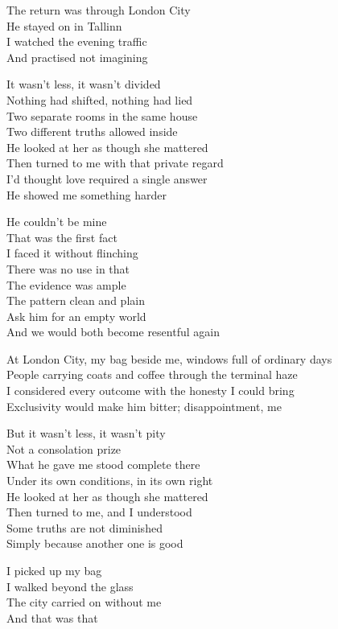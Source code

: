 \begin{lyrics}
The return was through London City\\
He stayed on in Tallinn\\
I watched the evening traffic\\
And practised not imagining

It wasn’t less, it wasn’t divided\\
Nothing had shifted, nothing had lied\\
Two separate rooms in the same house\\
Two different truths allowed inside\\
He looked at her as though she mattered\\
Then turned to me with that private regard\\
I’d thought love required a single answer\\
He showed me something harder

He couldn’t be mine\\
That was the first fact\\
I faced it without flinching\\
There was no use in that\\
The evidence was ample\\
The pattern clean and plain\\
Ask him for an empty world\\
And we would both become resentful again

At London City, my bag beside me, windows full of ordinary days\\
People carrying coats and coffee through the terminal haze\\
I considered every outcome with the honesty I could bring\\
Exclusivity would make him bitter; disappointment, me

But it wasn’t less, it wasn’t pity\\
Not a consolation prize\\
What he gave me stood complete there\\
Under its own conditions, in its own right\\
He looked at her as though she mattered\\
Then turned to me, and I understood\\
Some truths are not diminished\\
Simply because another one is good

I picked up my bag\\
I walked beyond the glass\\
The city carried on without me\\
And that was that
\end{lyrics}

